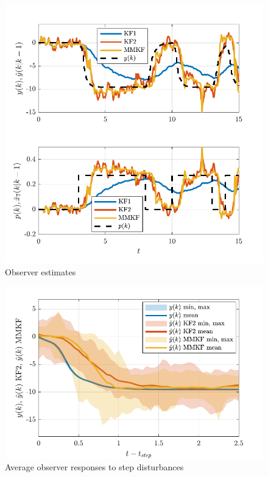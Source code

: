 \begin{figure}[htp]
	\centering
	\includegraphics[width=12cm]{images/rod_obs_sim_1_est_P2DcTd4.pdf}
	\caption{Observer estimates}
	\label{fig:rod_obs_sim_1_est_P2DcTd4}
\end{figure}

\begin{figure}[htp]
	\centering
	\includegraphics[width=12cm]{images/sim_resp_plot1_P2DcTd4.pdf}
	\caption{Average observer responses to step disturbances}
	\label{fig:sim_resp_plot}
\end{figure}

